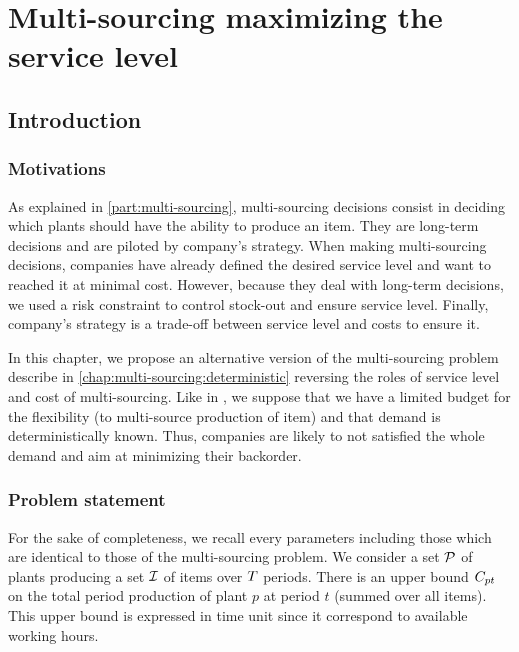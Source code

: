\chapter{Multi-sourcing maximizing the service level}



\section{Introduction}


\subsection{Motivations}


As explained in \cref{part:multi-sourcing}, multi-sourcing decisions consist in deciding which plants should have the ability to produce an item.
They are long-term decisions and are piloted by company's strategy.
When making multi-sourcing decisions, companies have already defined the desired service level and want to reached it at minimal cost.
However, because they deal with long-term decisions, we used a risk constraint to control stock-out and ensure service level.
Finally, company's strategy is a trade-off between service level and costs to ensure it.


In this chapter, we propose an alternative version of the multi-sourcing problem describe in \cref{chap:multi-sourcing:deterministic} reversing the roles of service level and cost of multi-sourcing.
Like in \citet{Fiorotto2018}, we suppose that we have a limited budget for the flexibility (\ie to multi-source production of item) and that demand is deterministically known.
Thus, companies are likely to not satisfied the whole demand and aim at minimizing their backorder.



\subsection{Problem statement}


For the sake of completeness, we recall every parameters including those which are identical to those of the multi-sourcing problem.
We consider a set $\mathcal{P}$ of plants producing a set $\mathcal{I}$ of items over $T$ periods.
There is an upper bound $C_{pt}$ on the total period production of plant $p$ at period $t$ (summed over all items).
This upper bound is expressed in time unit since it correspond to available working hours.


